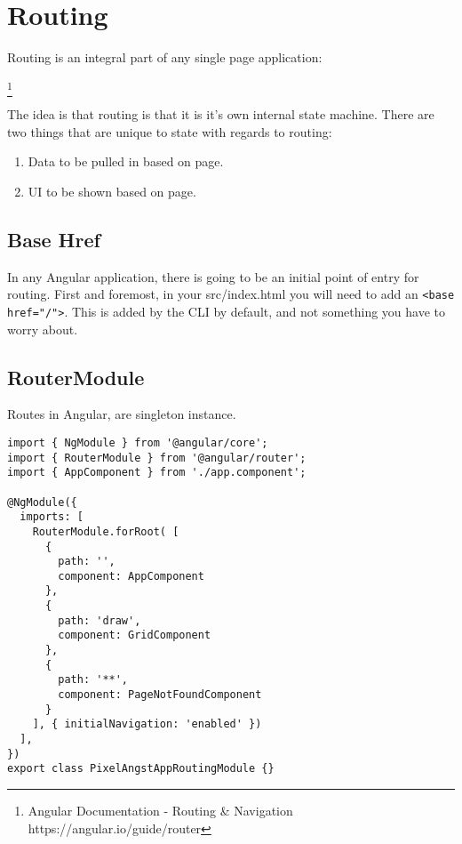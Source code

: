 \section{ Routing }
\maketitle{}

Routing is an integral part of any single page application:
\begin{displayquote}
 \footnote{Angular Documentation - Routing \& Navigation https://angular.io/guide/router}
\end{displayquote}
The idea is that routing is that it is it's own internal state machine. There
are two things that are unique to state with regards to routing:
\begin{enumerate}
  \item Data to be pulled in based on page.
  \item UI to be shown based on page.
\end{enumerate}

\subsection{Base Href}
In any Angular application, there is going to be an initial point of entry for
routing. First and foremost, in your src/index.html you will need to add an
\lstinline{<base href="/">}. This is added by the CLI by default, and not
something you have to worry about.

\subsection{ RouterModule }
Routes in Angular, are singleton instance.

\begin{lstlisting}[caption=app.module.ts file]
import { NgModule } from '@angular/core';
import { RouterModule } from '@angular/router';
import { AppComponent } from './app.component';

@NgModule({
  imports: [
    RouterModule.forRoot( [
      {
        path: '',
        component: AppComponent
      },
      {
        path: 'draw',
        component: GridComponent
      },
      {
        path: '**',
        component: PageNotFoundComponent
      }
    ], { initialNavigation: 'enabled' })
  ],
})
export class PixelAngstAppRoutingModule {}
\end{lstlisting}

